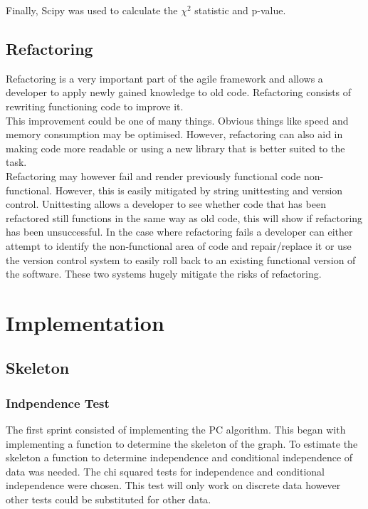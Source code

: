 \documentclass{article}
\begin{document}
Finally, Scipy was used to calculate the $\chi^2$ statistic and p-value. \\

\subsection{Refactoring}
Refactoring is a very important part of the agile framework and allows a developer to apply newly gained knowledge to old code. Refactoring consists of rewriting functioning code to improve it.\\

This improvement could be one of many things. Obvious things like speed and memory consumption may be optimised. However, refactoring can also aid in making code more readable or using a new library that is better suited to the task.\\

Refactoring may however fail and render previously functional code non-functional. However, this is easily mitigated by string unittesting and version control. Unittesting allows a developer to see whether code that has been refactored still functions in the same way as old code, this will show if refactoring has been unsuccessful. In the case where refactoring fails a developer can either attempt to identify the non-functional area of code and repair/replace it or use the version control system to easily roll back to an existing functional version of the software. These two systems hugely mitigate the risks of refactoring.\\

\section{Implementation}
\subsection{Skeleton}
\subsubsection{Indpendence Test}
The first sprint consisted of implementing the PC algorithm. This began with implementing a function to determine the skeleton of the graph. To estimate the skeleton a function to determine independence and conditional independence of data was needed. The chi squared tests for independence and conditional independence were chosen. This test will only work on discrete data however other tests could be substituted for other data.
\\
\end{document}
